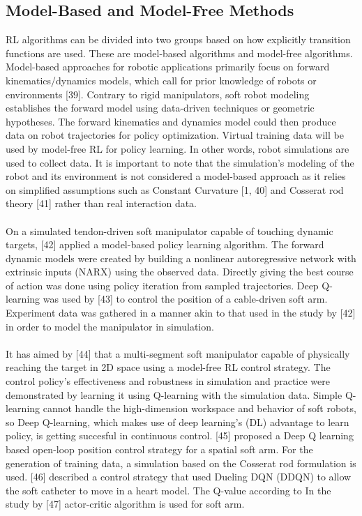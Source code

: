 \documentclass[12pt,twoside,a4]{mwbk}
\begin{document}
\subsection{Model-Based and Model-Free Methods}
RL algorithms can be divided into two groups based on how explicitly transition functions are used. These are model-based algorithms and model-free algorithms. Model-based approaches for robotic applications primarily focus on forward kinematics/dynamics models, which call for prior knowledge of robots or environments [39]. Contrary to rigid manipulators, soft robot modeling establishes the forward model using data-driven techniques or geometric hypotheses. The forward kinematics and dynamics model could then produce data on robot trajectories for policy optimization. Virtual training data will be used by model-free RL for policy learning. In other words, robot simulations are used to collect data. It is important to note that the simulation's modeling of the robot and its environment is not considered a model-based approach as it relies on simplified assumptions such as Constant Curvature [1, 40] and Cosserat rod theory [41] rather than real interaction data.
\\ \\
On a simulated tendon-driven soft manipulator capable of touching dynamic targets, [42] applied a model-based policy learning algorithm. The forward dynamic models were created by building a nonlinear autoregressive network with extrinsic inputs (NARX) using the observed data. Directly giving the best course of action was done using policy iteration from sampled trajectories. Deep Q-learning was used by [43] to control the position of a cable-driven soft arm. Experiment data was gathered in a manner akin to that used in the study by [42] in order to model the manipulator in simulation.
\\ \\
It has aimed by [44] that a multi-segment soft manipulator capable of physically reaching the target in 2D space using a model-free RL control strategy. The control policy's effectiveness and robustness in simulation and practice were demonstrated by learning it using Q-learning with the simulation data. Simple Q-learning cannot handle the high-dimension workspace and behavior of soft robots, so Deep Q-learning, which makes use of deep learning's (DL) advantage to learn policy, is getting succesful in continuous control. [45] proposed a Deep Q learning based open-loop position control strategy for a spatial soft arm. For the generation of training data, a simulation based on the Cosserat rod formulation is used. [46] described a control strategy that used Dueling DQN (DDQN) to allow the soft catheter to move in a heart model. The Q-value according to In the study by [47] actor-critic algorithm is used for soft arm.  
\end{document}
